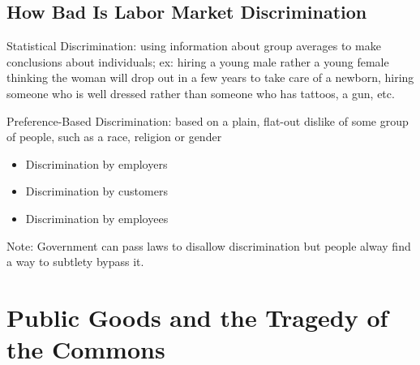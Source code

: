 \documentclass[12pt]{article}
\begin{document}
\subsection{How Bad Is Labor Market Discrimination}
\begin{definition} Statistical Discrimination: using information about group averages to make conclusions about individuals; ex: hiring a young male rather a young female thinking the woman will drop out in a few years to take care of a newborn, hiring someone who is well dressed rather than someone who has tattoos, a gun, etc. \end{definition}
\begin{definition} Preference-Based Discrimination: based on a plain, flat-out dislike of some group of people, such as a race, religion or gender \begin{itemize} 
\item Discrimination by employers \item Discrimination by customers \item Discrimination by employees \end{itemize} \end{definition}
Note: Government can pass laws to disallow discrimination but people alway find a way to subtlety bypass it. 

\section{Public Goods and the Tragedy of the Commons}
\end{document}

